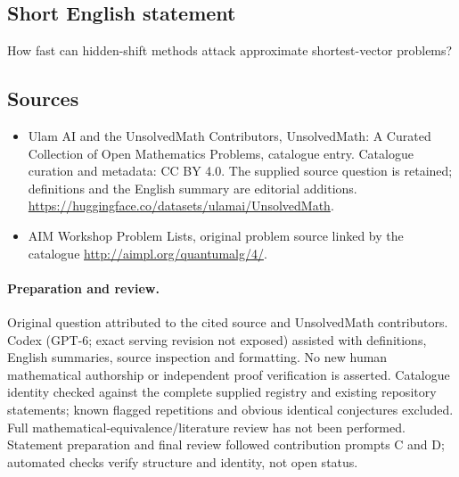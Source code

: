 \documentclass[11pt]{article}
\begin{document}
\subsection{Short English statement}
How fast can hidden-shift methods attack approximate shortest-vector problems?
\subsection{Sources}
\begin{itemize}
\item[\hypertarget{source:statement:1}{S1}] Ulam AI and the UnsolvedMath Contributors, UnsolvedMath: A Curated Collection of Open Mathematics Problems, catalogue entry. Catalogue curation and metadata: CC BY 4.0. The supplied source question is retained; definitions and the English summary are editorial additions.
\url{https://huggingface.co/datasets/ulamai/UnsolvedMath}.
\item[\hypertarget{source:statement:2}{S2}] AIM Workshop Problem Lists, original problem source linked by the catalogue
\url{http://aimpl.org/quantumalg/4/}.
\end{itemize}
\paragraph{Preparation and review.}
Original question attributed to the cited source and UnsolvedMath contributors. Codex (GPT-6; exact serving revision not exposed) assisted with definitions, English summaries, source inspection and formatting. No new human mathematical authorship or independent proof verification is asserted. Catalogue identity checked against the complete supplied registry and existing repository statements; known flagged repetitions and obvious identical conjectures excluded. Full mathematical-equivalence/literature review has not been performed. Statement preparation and final review followed contribution prompts C and D; automated checks verify structure and identity, not open status.
\label{end:statement}
\end{document}
